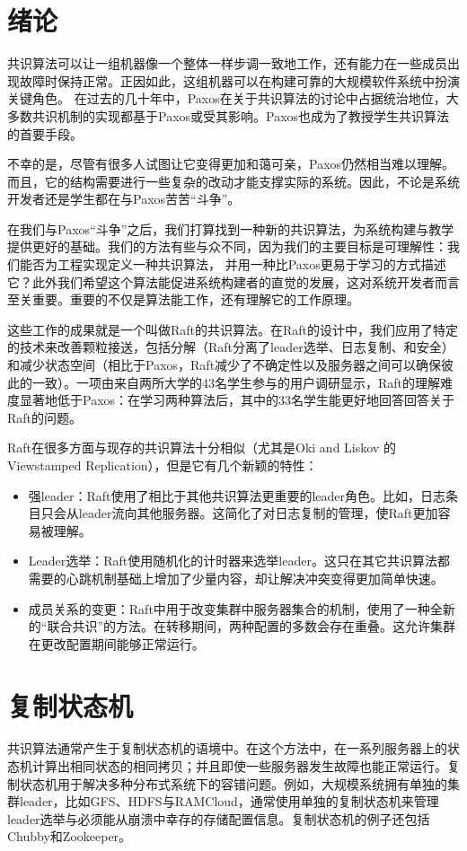 
\chapter{绪论}%
共识算法可以让一组机器像一个整体一样步调一致地工作，还有能力在一些成员出现故障时保持正常。正因如此，这组机器可以在构建可靠的大规模软件系统中扮演关键角色。
在过去的几十年中，Paxos在关于共识算法的讨论中占据统治地位，大多数共识机制的实现都基于Paxos或受其影响。Paxos也成为了教授学生共识算法的首要手段。

不幸的是，尽管有很多人试图让它变得更加和蔼可亲，Paxos仍然相当难以理解。而且，它的结构需要进行一些复杂的改动才能支撑实际的系统。因此，不论是系统开发者还是学生都在与Paxos苦苦“斗争”。

在我们与Paxos“斗争”之后，我们打算找到一种新的共识算法，为系统构建与教学提供更好的基础。我们的方法有些与众不同，因为我们的主要目标是可理解性：我们能否为工程实现定义一种共识算法，
并用一种比Paxos更易于学习的方式描述它？此外我们希望这个算法能促进系统构建者的直觉的发展，这对系统开发者而言至关重要。重要的不仅是算法能工作，还有理解它的工作原理。

这些工作的成果就是一个叫做Raft的共识算法。在Raft的设计中，我们应用了特定的技术来改善颗粒接送，包括分解（Raft分离了leader选举、日志复制、和安全）和减少状态空间（相比于Paxos，Raft减少了不确定性以及服务器之间可以确保彼此的一致）。一项由来自两所大学的43名学生参与的用户调研显示，Raft的理解难度显著地低于Paxos：在学习两种算法后，其中的33名学生能更好地回答回答关于Raft的问题。

Raft在很多方面与现存的共识算法十分相似（尤其是Oki and Liskov 的 Viewstamped Replication），但是它有几个新颖的特性：
\begin{itemize}
    \item 强leader：Raft使用了相比于其他共识算法更重要的leader角色。比如，日志条目只会从leader流向其他服务器。这简化了对日志复制的管理，使Raft更加容易被理解。
    \item Leader选举：Raft使用随机化的计时器来选举leader。这只在其它共识算法都需要的心跳机制基础上增加了少量内容，却让解决冲突变得更加简单快速。
    \item 成员关系的变更：Raft中用于改变集群中服务器集合的机制，使用了一种全新的“联合共识”的方法。在转移期间，两种配置的多数会存在重叠。这允许集群在更改配置期间能够正常运行。
\end{itemize}

\chapter{复制状态机}
共识算法通常产生于复制状态机的语境中。在这个方法中，在一系列服务器上的状态机计算出相同状态的相同拷贝；并且即使一些服务器发生故障也能正常运行。复制状态机用于解决多种分布式系统下的容错问题。例如，大规模系统拥有单独的集群leader，比如GFS、HDFS与RAMCloud，通常使用单独的复制状态机来管理leader选举与必须能从崩溃中幸存的存储配置信息。复制状态机的例子还包括Chubby和Zookeeper。

